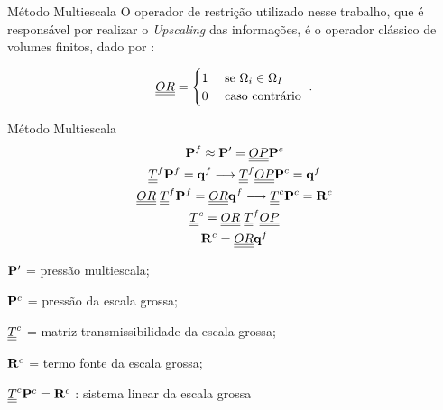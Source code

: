 \documentclass[professionalfont]{beamer}
\begin{document}
\begin{frame}{Método Multiescala}
    O operador de restrição utilizado nesse trabalho, que é responsável por realizar o \textit{Upscaling} das informações, é o operador clássico de volumes finitos, dado por \cite{Tene_2016}:

    \begin{equation}
        \label{eq:multiescala.11}
        \underline{\underline{OR}} = 
        \begin{cases}
            1 & \text{ se } \Omega_{i} \in \Omega_{I}\\
            0 & \text{ caso contrário }
        \end{cases}.
    \end{equation}
\end{frame}

\begin{frame}{Método Multiescala}
    \small
    \begin{gather*}
        \mathbf{P}^{f} \approx \bold{P}' = \underline{\underline{OP}} \bold{P}^{c} \\
        \underline{\underline{T}}^{f} \mathbf{P}^{f} = \mathbf{q}^{f}  \longrightarrow \underline{\underline{T}}^{f} \underline{\underline{OP}} \bold{P}^{c} = \mathbf{q}^{f} \\
        \underline{\underline{OR}} \hspace{0.1cm} \underline{\underline{T}}^{f} \mathbf{P}^{f} = \underline{\underline{OR}} \mathbf{q}^{f}  \longrightarrow \underline{\underline{T}}^{c} \bold{P}^{c} = \bold{R}^{c} \\
        \underline{\underline{T}}^{c} = \underline{\underline{OR}} \hspace{0.1cm} \underline{\underline{T}}^{f} \underline{\underline{OP}} \\
        \bold{R}^{c} = \underline{\underline{OR}} \mathbf{q}^{f}
    \end{gather*}

    \begin{description}[]
        \item $\bold{P}'$ = pressão multiescala;
        \item $\bold{P}^{c}$ = pressão da escala grossa;
        \item $\underline{\underline{T}}^{c}$ = matriz transmissibilidade da escala grossa;
        \item $\bold{R}^{c}$ = termo fonte da escala grossa;
        \item $\underline{\underline{T}}^{c} \bold{P}^{c} = \bold{R}^{c}$ : sistema linear da escala grossa
    \end{description}
\end{frame}
\end{document}
